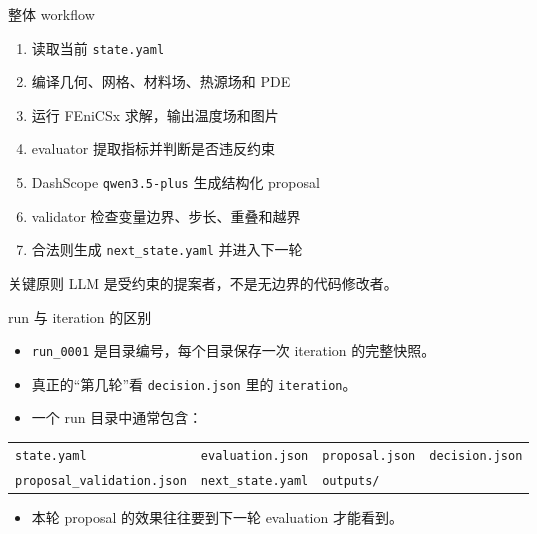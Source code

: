 \documentclass[aspectratio=169]{ctexbeamer}
\begin{document}
\begin{frame}{整体 workflow}
\small
\begin{enumerate}
\item 读取当前 \texttt{state.yaml}
\item 编译几何、网格、材料场、热源场和 PDE
\item 运行 FEniCSx 求解，输出温度场和图片
\item evaluator 提取指标并判断是否违反约束
\item DashScope \texttt{qwen3.5-plus} 生成结构化 proposal
\item validator 检查变量边界、步长、重叠和越界
\item 合法则生成 \texttt{next\_state.yaml} 并进入下一轮
\end{enumerate}
\vspace{0.2cm}
\begin{block}{关键原则}
LLM 是受约束的提案者，不是无边界的代码修改者。
\end{block}
\end{frame}

\begin{frame}{run 与 iteration 的区别}
\small
\begin{itemize}
\item \texttt{run\_0001} 是目录编号，每个目录保存一次 iteration 的完整快照。
\item 真正的“第几轮”看 \texttt{decision.json} 里的 \texttt{iteration}。
\item 一个 run 目录中通常包含：
\end{itemize}
\begin{center}
\begin{tabular}{llll}
\texttt{state.yaml} & \texttt{evaluation.json} & \texttt{proposal.json} & \texttt{decision.json} \\
\texttt{proposal\_validation.json} & \texttt{next\_state.yaml} & \texttt{outputs/} & \\
\end{tabular}
\end{center}
\begin{itemize}
\item 本轮 proposal 的效果往往要到下一轮 evaluation 才能看到。
\end{itemize}
\end{frame}
\end{document}
